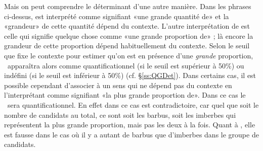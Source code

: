 \begin{exo}
\begin{solu}
Mais on peut comprendre le déterminant  d'une
autre manière. Dans les phrases ci-dessus,  est
interprété comme signifiant «une grande quantité de» et la
«grandeur» de cette quantité dépend du contexte. L'autre interprétation de
 est celle qui signifie quelque chose comme «une grande proportion de» ; là encore la grandeur de cette proportion dépend habituellement du contexte.  Selon le seuil que fixe le contexte pour estimer qu'on est en présence d'une \emph{grande} proportion,  \GN\ apparaîtra alors comme quantificationnel (si le seuil est supérieur à 50\%) ou indéfini (si le seuil est inférieur à 50\%) (cf. \S\ref{ss:QGDet}).   Dans certains cas, il est possible cependant d'associer à  un sens qui ne dépend pas du contexte en l'interprétant comme signifiant «la plus grande proportion de».  Dans ce cas le \GN\ sera quantificationnel.  En 
effet dans ce cas  est contradictoire, car quel que soit le
nombre de candidats au total, ce sont soit les barbus, soit les
imberbes qui représentent la plus grande proportion, mais pas les deux
à la fois.  Quant à , elle est fausse dans le cas où il y a
autant de barbus que d'imberbes dans le groupe de candidats.
\end{solu}
\end{exo}
